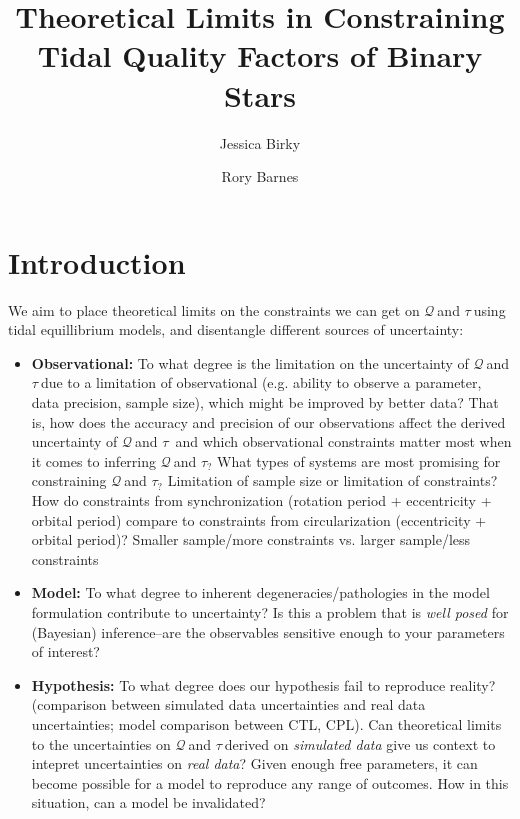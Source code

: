 \documentclass[]{aastex631}
\newcommand{\ttau}[1]{$\tau_{#1}$}
\newcommand{\tq}[1]{$\mathcal{Q}_{#1}$}
\begin{document}
\title{Theoretical Limits in Constraining Tidal Quality Factors of Binary Stars}



\author{Jessica Birky}
\author{Rory Barnes}


\begin{abstract}
\end{abstract}


\section{Introduction} \label{sec:intro}

We aim to place theoretical limits on the constraints we can get on \tq\ and \ttau\ using tidal equillibrium models, and disentangle different sources of uncertainty: 
\begin{itemize}
    \item \textbf{Observational:} To what degree is the limitation on the uncertainty of \tq\ and \ttau\ due to a limitation of observational (e.g. ability to observe a parameter, data precision, sample size), which might be improved by better data? That is, how does the accuracy and precision of our observations affect the derived uncertainty of \tq\ and \ttau\, and which observational constraints matter most when it comes to inferring \tq\ and \ttau? What types of systems are most promising for constraining \tq\ and \ttau? Limitation of sample size or limitation of constraints? How do constraints from synchronization (rotation period + eccentricity + orbital period) compare to constraints from circularization (eccentricity + orbital period)? Smaller sample/more constraints vs. larger sample/less constraints

    \item \textbf{Model:} To what degree to inherent degeneracies/pathologies in the model formulation contribute to uncertainty? Is this a problem that is \emph{well posed} for (Bayesian) inference--are the observables sensitive enough to your parameters of interest?

    \item \textbf{Hypothesis:} To what degree does our hypothesis fail to reproduce reality? (comparison between simulated data uncertainties and real data uncertainties; model comparison between CTL, CPL). Can theoretical limits to the uncertainties on \tq\ and \ttau\ derived on \emph{simulated data} give us context to intepret uncertainties on \emph{real data}? Given enough free parameters, it can become possible for a model to reproduce any range of outcomes. How in this situation, can a model be invalidated?
\end{itemize}
\end{document}
